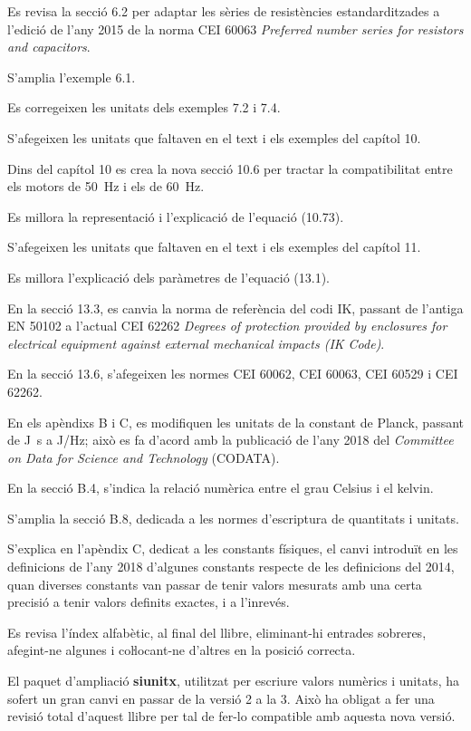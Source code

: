 Es revisa la secció 6.2 per adaptar les sèries de resistències estandarditzades a l'edició de l'any 2015 de la norma CEI 60063 \textit{Preferred number series for resistors and capacitors}.

S'amplia l'exemple 6.1.

Es corregeixen les unitats dels exemples 7.2 i 7.4.

S'afegeixen les unitats que faltaven en el text i els exemples del capítol 10. 

Dins del capítol 10 es crea la nova secció 10.6 per tractar la compatibilitat entre els motors de \qty{50}{Hz} i els de \qty{60}{Hz}.

Es millora la representació i l'explicació de l'equació (10.73).

S'afegeixen les unitats que faltaven en el text i els exemples del capítol 11.

Es millora l'explicació dels paràmetres de l'equació  (13.1).

En la  secció 13.3, es canvia la norma de referència del codi IK, passant de l'antiga EN 50102 a l'actual CEI 62262 \textit{Degrees of protection provided by enclosures for
electrical equipment against external mechanical impacts (IK Code)}.

En la secció 13.6, s'afegeixen les normes CEI 60062,  CEI 60063,  CEI 60529 i  CEI 62262.

En els apèndixs  B i C, es modifiquen les unitats de la constant de Planck, passant de \unit{J.s} a \unit{J/Hz}; això es fa d'acord amb  la publicació de l'any 2018 del \textit{Committee on Data for Science and Technology} (CODATA).

En la secció B.4, s'indica la relació numèrica entre el grau Celsius i el kelvin.

S'amplia la secció B.8, dedicada a les normes d'escriptura de quantitats i unitats.


S'explica en l'apèndix C, dedicat a les constants físiques,  el canvi introduït en les definicions de l'any 2018 d'algunes constants respecte de les definicions del 2014, quan diverses constants  van passar de tenir valors mesurats amb una certa precisió a tenir valors definits exactes, i a l'inrevés.

Es revisa l'índex alfabètic, al final del llibre, eliminant-hi entrades sobreres, afegint-ne algunes i coŀlocant-ne d'altres en la posició correcta.


El paquet d'ampliació \textbf{\textsf{siunitx}}, utilitzat per escriure valors numèrics i unitats, ha sofert un gran canvi en passar de la versió 2 a la 3. Això ha obligat a fer una  revisió total d'aquest llibre per tal de fer-lo compatible amb aquesta nova versió. 

